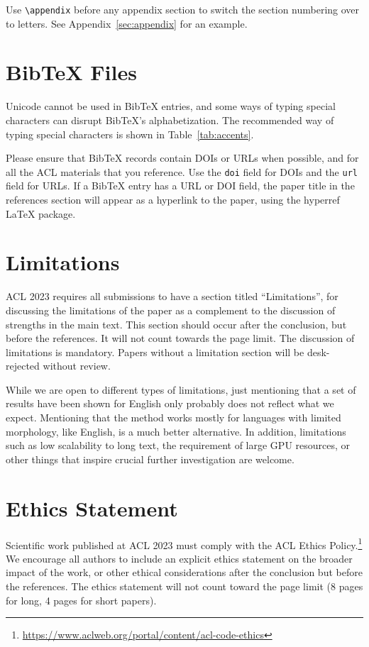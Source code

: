 \documentclass[11pt]{article}
\begin{document}
Use \verb|\appendix| before any appendix section to switch the section numbering over to letters. See Appendix~\ref{sec:appendix} for an example.

\section{Bib\TeX{} Files}
\label{sec:bibtex}

Unicode cannot be used in Bib\TeX{} entries, and some ways of typing special characters can disrupt Bib\TeX's alphabetization. The recommended way of typing special characters is shown in Table~\ref{tab:accents}.

Please ensure that Bib\TeX{} records contain DOIs or URLs when possible, and for all the ACL materials that you reference.
Use the \verb|doi| field for DOIs and the \verb|url| field for URLs.
If a Bib\TeX{} entry has a URL or DOI field, the paper title in the references section will appear as a hyperlink to the paper, using the hyperref \LaTeX{} package.

\section*{Limitations}
ACL 2023 requires all submissions to have a section titled ``Limitations'', for discussing the limitations of the paper as a complement to the discussion of strengths in the main text. This section should occur after the conclusion, but before the references. It will not count towards the page limit.
The discussion of limitations is mandatory. Papers without a limitation section will be desk-rejected without review.

While we are open to different types of limitations, just mentioning that a set of results have been shown for English only probably does not reflect what we expect. 
Mentioning that the method works mostly for languages with limited morphology, like English, is a much better alternative.
In addition, limitations such as low scalability to long text, the requirement of large GPU resources, or other things that inspire crucial further investigation are welcome.

\section*{Ethics Statement}
Scientific work published at ACL 2023 must comply with the ACL Ethics Policy.\footnote{\url{https://www.aclweb.org/portal/content/acl-code-ethics}} We encourage all authors to include an explicit ethics statement on the broader impact of the work, or other ethical considerations after the conclusion but before the references. The ethics statement will not count toward the page limit (8 pages for long, 4 pages for short papers).
\end{document}
